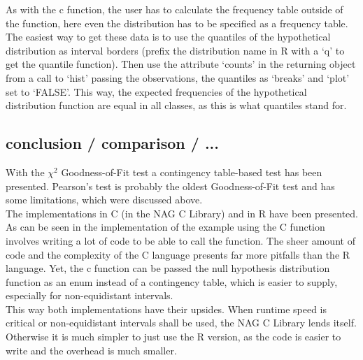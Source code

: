 \documentclass{article}
\theoremstyle{definition}
\begin{document}
As with the c function, the user has to calculate the frequency table outside of the function, here even the distribution has to be specified as a frequency table.
The easiest way to get these data is to use the  quantiles of the hypothetical distribution as interval borders (prefix the distribution name in R with a `q' to get the quantile function).
Then use the attribute `counts' in the returning object from a call to `hist' passing the observations, the quantiles as `breaks' and `plot' set to `FALSE'.
This way, the expected frequencies of the hypothetical distribution function are equal in all classes, as this is what quantiles stand for.

\subsection{conclusion / comparison / ...}
With the $\chi^2$ Goodness-of-Fit test a contingency table-based test has been presented.
Pearson's test is probably the oldest Goodness-of-Fit test and has some limitations, which were discussed above.
\\
The implementations in C (in the NAG C Library) and in R have been presented.
As can be seen in the implementation of the example using the C function involves writing a lot of code to be able to call the function.
The sheer amount of code and the complexity of the C language presents far more pitfalls than the R language.
Yet, the c function can be passed the null hypothesis distribution function as an enum instead of a contingency table, which is easier to supply, especially for non-equidistant intervals.
\\
This way both implementations have their upsides.
When runtime speed is critical or non-equidistant intervals shall be used, the NAG C Library lends itself.
Otherwise it is much simpler to just use the R version, as the code is easier to write and the overhead is much smaller.
\end{document}
